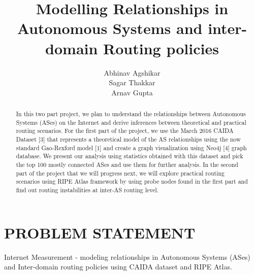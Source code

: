 \documentclass{sig-alternate-05-2015}
\begin{document}

\title{Modelling Relationships in Autonomous Systems and inter-domain Routing policies}

%
\author{
%
%
\alignauthor Abhinav Agshikar\\
\alignauthor
Sagar Thakkar\\
\alignauthor
Arnav Gupta\\
}


\maketitle
\section{PROBLEM STATEMENT}
Internet Measurement - modeling relationships in Autonomous Systems (ASes) and Inter-domain routing policies using CAIDA dataset and RIPE Atlas. 

\begin{abstract}
In this two part project, we plan to understand the relationships between Autonomous Systems (ASes) on the Internet and derive inferences
between theoretical and practical routing scenarios. For the first part of the project, we use the March 2016 CAIDA Dataset  [3] that 
represents a theoretical model of the AS relationships using the now standard Gao-Rexford model  [1] and create
a graph visualization using Neo4j [4] graph database. We present our analysis using statistics obtained with this dataset and pick the top 100
mostly connected ASes and use them for further analysis. In the second part  of the project that we will progress next,
we will explore practical routing scenarios using RIPE Atlas framework by using probe nodes found in the first part and find out routing
instabilities at inter-AS routing level.

\end{abstract}
\end{document}
